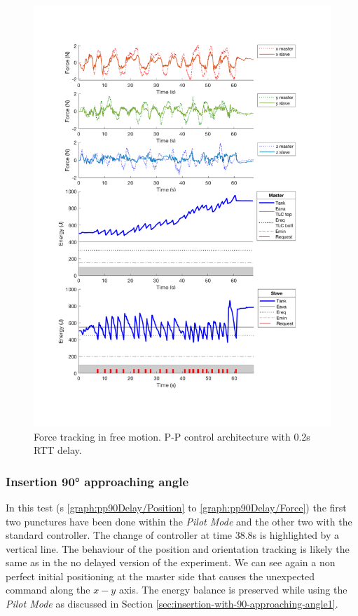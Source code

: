 \begin{center}
	\begin{figure}
		\includegraphics[width=\textwidth, keepaspectratio]{plots/ppDelay/Force.pdf}
		\caption{Force tracking in free motion. P-P control architecture with 0.2s RTT delay.}
		\label{graph:ppFreeDelay/Force}
	\end{figure}
\end{center}
\newpage
\subsubsection{Insertion 90° approaching angle}
In this test  (\figurename s{ \ref{graph:pp90Delay/Position} to \ref{graph:pp90Delay/Force}}) the first two punctures have been done within the \textit{Pilot Mode} and the other two with the standard controller.
The change of controller at time 38.8s is highlighted by a vertical line.
The behaviour of the position and orientation tracking is likely the same as in the no delayed version of the experiment. We can see again a non perfect initial positioning at the master side that causes the unexpected command along the $x-y$ axis.
The energy balance is preserved while using the \textit{Pilot Mode} as discussed in Section \ref{sec:insertion-with-90-approaching-angle1}.

